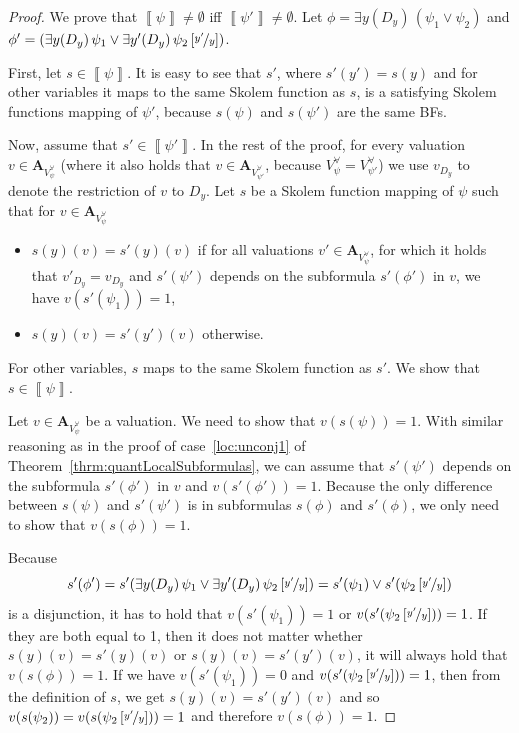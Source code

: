 \documentclass[
  digital, %
  color,
  twoside, %
  table,   %
  nolof,     %
  nolot,     %
]{fithesis3}
\theoremstyle{definition}
\theoremstyle{remark}
\newcommand{\seman}[1]{\left\llbracket {#1} \right\rrbracket}
\newcommand{\substitute}[2]{\left[ \nicefrac{#2}{#1} \right]}
\newcommand{\valtns}[1]{\mathbf{A}_{#1}}
\newcommand{\uvars}[1]{V_{#1}^{\forall}}
\newcommand{\itholds}{\,}
\begin{document}
\begin{proof}
  We prove that $\seman{\psi} \not= \emptyset$ iff $\seman{\psi'} \not= \emptyset$. Let $\phi = \exists y(D_y) \itholds (\psi_1 \lor \psi_2)$ and $\phi' = (\exists y(D_y) \itholds \psi_1 \lor \exists y'(D_y) \itholds \psi_2\substitute{y}{y'})$. 
  
  First, let $s \in \seman{\psi}$. It is easy to see that $s'$, where $s'(y') = s(y)$ and for other variables it maps to the same Skolem function as $s$, is a satisfying Skolem functions mapping of $\psi'$, because $s(\psi)$ and $s(\psi')$ are the same BFs.
  
  Now, assume that $s' \in \seman{\psi'}$. In the rest of the proof, for every valuation $v \in \valtns{\uvars{\psi}}$ (where it also holds that $v \in \valtns{\uvars{\psi'}}$, because $\uvars{\psi} = \uvars{\psi'}$) we use $v_{D_y}$ to denote the restriction of $v$ to $D_y$. Let $s$ be a Skolem function mapping of $\psi$ such that for $v \in \valtns{\uvars{\psi}}$ 
  \begin{itemize}
      \item $s(y)(v) = s'(y)(v)$ if for all valuations $v' \in \valtns{\uvars{\psi}}$, for which it holds that $v'_{D_y} = v_{D_y}$ and $s'(\psi')$ depends on the subformula $s'(\phi')$ in $v$, we have $v(s'(\psi_1)) = 1$,
      \item $s(y)(v) = s'(y')(v)$ otherwise.
  \end{itemize}
  For other variables, $s$ maps to the same Skolem function as $s'$. We show that $s \in \seman{\psi}$.
  
  Let $v \in \valtns{\uvars{\psi}}$ be a valuation. We need to show that $v(s(\psi)) = 1$. With similar reasoning as in the proof of case~\eqref{loc:unconj1} of Theorem~\ref{thrm:quantLocalSubformulas}, we can assume that $s'(\psi')$ depends on the subformula $s'(\phi')$ in $v$ and $v(s'(\phi')) = 1$. Because the only difference between $s(\psi)$ and $s'(\psi')$ is in subformulas $s(\phi)$ and $s'(\phi)$, we only need to show that $v(s(\phi)) = 1$.
  
  Because 
  \[s'(\phi') = s'(\exists y(D_y) \itholds \psi_1 \lor \exists y'(D_y) \itholds \psi_2\substitute{y}{y'}) = s'(\psi_1) \lor s'(\psi_2\substitute{y}{y'})\] is a disjunction, it has to hold that $v(s'(\psi_1)) = 1$ or $v(s'(\psi_2\substitute{y}{y'})) = 1$.
  If they are both equal to 1, then it does not matter whether $s(y)(v) = s'(y)(v)$ or $s(y)(v) = s'(y')(v)$, it will always hold that $v(s(\phi)) = 1$.
  If we have $v(s'(\psi_1)) = 0$ and $v(s'(\psi_2\substitute{y}{y'})) = 1$, then from the definition of $s$, we get $s(y)(v) = s'(y')(v)$ and so $v(s(\psi_2)) = v(s(\psi_2\substitute{y}{y'})) = 1$ and therefore $v(s(\phi)) = 1$.
  

\end{proof}
\end{document}
